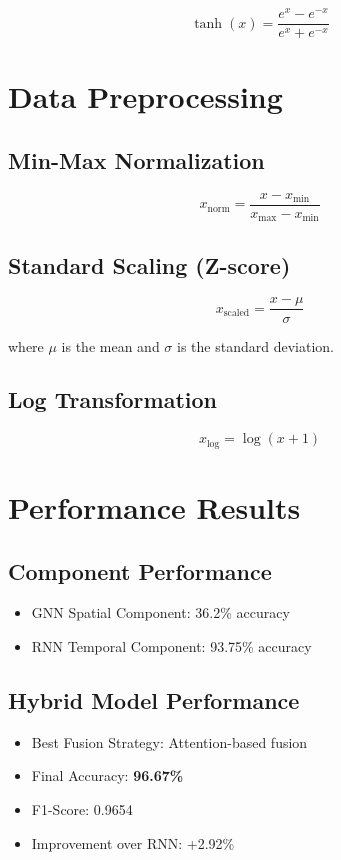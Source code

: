 \documentclass[12pt]{article}
\begin{document}
\begin{equation}
\tanh(x) = \frac{e^x - e^{-x}}{e^x + e^{-x}}
\end{equation}

\section{Data Preprocessing}

\subsection{Min-Max Normalization}

\begin{equation}
x_{\text{norm}} = \frac{x - x_{\min}}{x_{\max} - x_{\min}}
\end{equation}

\subsection{Standard Scaling (Z-score)}

\begin{equation}
x_{\text{scaled}} = \frac{x - \mu}{\sigma}
\end{equation}

where $\mu$ is the mean and $\sigma$ is the standard deviation.

\subsection{Log Transformation}

\begin{equation}
x_{\log} = \log(x + 1)
\end{equation}

\section{Performance Results}

\subsection{Component Performance}
\begin{itemize}
    \item GNN Spatial Component: 36.2\% accuracy
    \item RNN Temporal Component: 93.75\% accuracy
\end{itemize}

\subsection{Hybrid Model Performance}
\begin{itemize}
    \item Best Fusion Strategy: Attention-based fusion
    \item Final Accuracy: \textbf{96.67\%}
    \item F1-Score: 0.9654
    \item Improvement over RNN: +2.92\%
\end{itemize}
\end{document}
